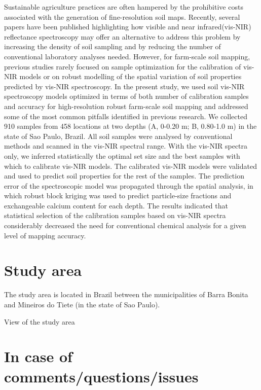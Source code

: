 \documentclass[]{book}
\begin{document}
Sustainable agriculture practices are often hampered by the prohibitive costs associated with the generation of fine-resolution soil maps. Recently, several papers have been published highlighting how visible and near infrared(vis-NIR) reflectance spectroscopy may offer an alternative to address this problem by increasing the density of soil sampling and by reducing the number of conventional laboratory analyses needed. However, for farm-scale soil mapping, previous studies rarely focused on sample optimization for the calibration of vis-NIR models or on robust modelling of the spatial variation of soil properties predicted by vis-NIR spectroscopy. In the present study, we used soil vis-NIR spectroscopy models optimized in terms of both number of calibration samples and accuracy for high-resolution robust farm-scale soil mapping and addressed some of the most common pitfalls identified in previous research. We collected 910 samples from 458 locations at two depths (A, 0-0.20 m; B, 0.80-1.0 m) in the state of Sao Paulo, Brazil. All soil samples were analysed by conventional methods and scanned in the vis-NIR spectral range. With the vis-NIR spectra only, we inferred statistically the optimal set size and the best samples with which to calibrate vis-NIR models. The calibrated vis-NIR models were validated and used to predict soil properties for the rest of the samples. The prediction error of the spectroscopic model was propagated through the spatial analysis, in which robust block kriging was used to predict particle-size fractions and exchangeable calcium content for each depth. The results indicated that statistical selection of the calibration samples based on vis-NIR spectra considerably decreased the need for conventional chemical analysis for a given level of mapping accuracy.

\hypertarget{study-area}{%
\section{Study area}\label{study-area}}

The study area is located in Brazil between the municipalities of Barra Bonita and Mineiros do Tiete (in the state of Sao Paulo).

\hypertarget{htmlwidget-49e0e3650e34c81eed9c}{}

\label{fig:unnamed-chunk-2}View of the study area

\hypertarget{in-case-of-commentsquestionsissues}{%
\section{In case of comments/questions/issues}\label{in-case-of-commentsquestionsissues}}
\end{document}
